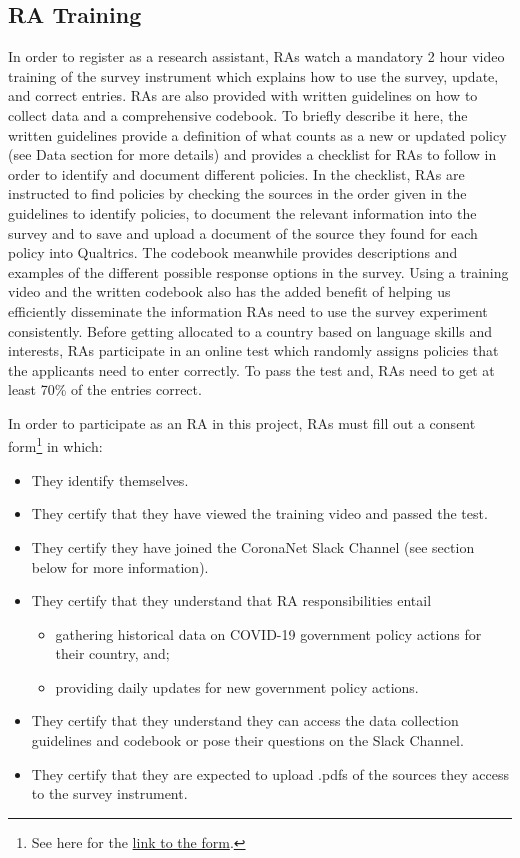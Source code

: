 \documentclass[]{article}
\providecommand{\tightlist}{%
  \setlength{\itemsep}{0pt}\setlength{\parskip}{0pt}}
\let\rmarkdownfootnote\footnote%
\def\footnote{\protect\rmarkdownfootnote}
\begin{document}
\hypertarget{ra-training}{%
\subsection{RA Training}\label{ra-training}}

In order to register as a research assistant, RAs watch a mandatory 2 hour video training of the survey instrument which explains how to use the survey, update, and correct entries. RAs are also provided with written guidelines on how to collect data and a comprehensive codebook. To briefly describe it here, the written guidelines provide a definition of what counts as a new or updated policy (see Data section for more details) and provides a checklist for RAs to follow in order to identify and document different policies. In the checklist, RAs are instructed to find policies by checking the sources in the order given in the guidelines to identify policies, to document the relevant information into the survey and to save and upload a document of the source they found for each policy into Qualtrics. The codebook meanwhile provides descriptions and examples of the different possible response options in the survey. Using a training video and the written codebook also has the added benefit of helping us efficiently disseminate the information RAs need to use the survey experiment consistently. Before getting allocated to a country based on language skills and interests, RAs participate in an online test which randomly assigns policies that the applicants need to enter correctly. To pass the test and, RAs need to get at least 70\% of the entries correct.

In order to participate as an RA in this project, RAs must fill out a consent form\footnote{See here for the \href{https://docs.google.com/forms/d/e/1FAIpQLSeybAW0DC0UE1x2EqLiTifVFuSUxqJLGFB8VI4wVCG61tVYKg/viewform}{link to the form}.} in which:

\begin{itemize}
\tightlist
\item
  They identify themselves.
\item
  They certify that they have viewed the training video and passed the test.
\item
  They certify they have joined the CoronaNet Slack Channel (see section below for more information).
\item
  They certify that they understand that RA responsibilities entail

  \begin{itemize}
  \tightlist
  \item
    gathering historical data on COVID-19 government policy actions for their country, and;
  \item
    providing daily updates for new government policy actions.
  \end{itemize}
\item
  They certify that they understand they can access the data collection guidelines and codebook or pose their questions on the Slack Channel.
\item
  They certify that they are expected to upload .pdfs of the sources they access to the survey instrument.
\end{itemize}
\end{document}
